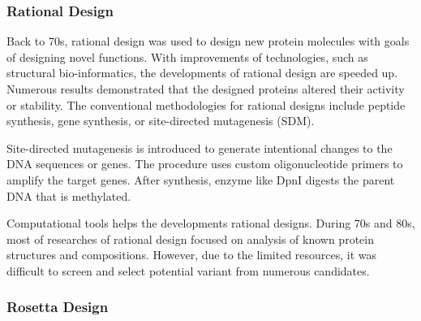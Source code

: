 \begin{refsection}
\subsubsection{Rational Design}

Back to 70s, rational design was used to design new protein molecules with
goals of designing novel functions\cite{Seydel1980}. With improvements of
technologies, such as structural bio-informatics, the developments of rational
design are speeded up.  Numerous results demonstrated that the designed
proteins altered their activity or stability\cite{Otten2010,Moss2009}. The
conventional methodologies for rational designs include peptide synthesis, gene
synthesis, or site-directed mutagenesis (SDM).

Site-directed mutagenesis is introduced to generate intentional changes to the
DNA sequences or genes. The procedure uses custom oligonucleotide primers to
amplify the target genes. After synthesis, enzyme like DpnI digests the parent
DNA that is methylated.   

Computational tools helps the developments rational designs. During 70s and
80s, most of researches of rational design focused on analysis of known protein
structures and compositions. However, due to the limited resources, it was
difficult to screen and select potential variant from numerous candidates.

\subsubsection{Rosetta Design}


\end{refsection}
